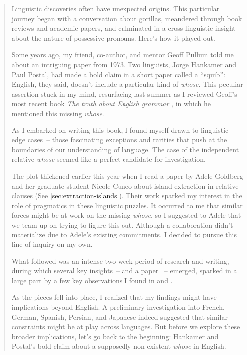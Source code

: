 \begin{quote}
    



Linguistic discoveries often have unexpected origins. This particular journey began with a conversation about gorillas, meandered through book reviews and academic papers, and culminated in a cross-linguistic insight about the nature of possessive pronouns. Here's how it played out.

Some years ago, my friend, co-author, and mentor Geoff Pullum told me about an intriguing paper from 1973. Two linguists, Jorge Hankamer and Paul Postal, had made a bold claim in a short paper called a ``squib'': English, they said, doesn't include a particular kind of \textit{whose}. This peculiar assertion stuck in my mind, resurfacing last summer as I reviewed Geoff's most recent book \textit{The truth about English grammar} \citep{pullum2024truth}, in which he mentioned this missing \textit{whose}.

As I embarked on writing this book, I found myself drawn to linguistic edge cases~-- those fascinating exceptions and rarities that push at the boundaries of our understanding of language. The case of the independent relative \textit{whose} seemed like a perfect candidate for investigation.

The plot thickened earlier this year when I read a paper by Adele Goldberg and her graduate student Nicole Cuneo \citep{Cuneo2023} about island extraction in relative clauses (See \ref{sec:extraction-islands}). Their work sparked my interest in the role of pragmatics in these linguistic puzzles. It occurred to me that similar forces might be at work on the missing \textit{whose}, so I suggested to Adele that we team up on trying to figure this out. Although a collaboration didn't materialize due to Adele's existing commitments, I decided to pursue this line of inquiry on my own.

What followed was an intense two-week period of research and writing, during which several key insights~-- and a paper \citep{reynolds2025whose}~-- emerged, sparked in a large part by a few key observations I found in \citet{Halliday1976cohesion} and \citet{Ariel2014}.

As the pieces fell into place, I realized that my findings might have implications beyond English. A preliminary investigation into French, German, Spanish, Persian, and Japanese indeed suggested that similar constraints might be at play across languages. But before we explore these broader implications, let's go back to the beginning: Hankamer and Postal's bold claim about a supposedly non-existent \textit{whose} in English.
\end{quote}

